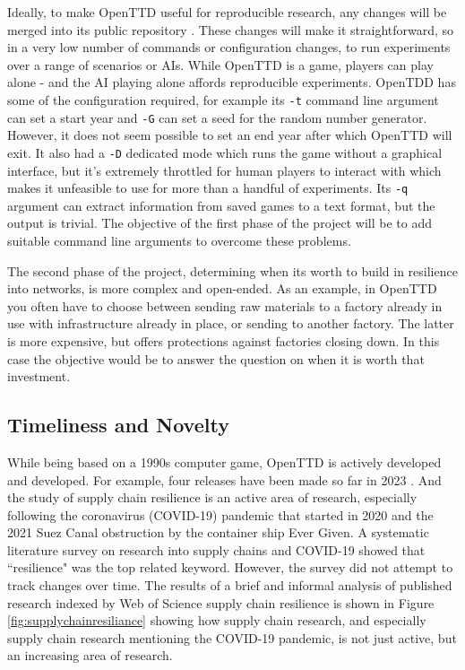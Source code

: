 \documentclass[a4paper,11pt]{article}
\begin{document}
Ideally, to make OpenTTD useful for reproducible research, any changes will be merged into its public repository \cite{openttdRepo}. These changes will make it straightforward, so in a very low number of commands or configuration changes, to run experiments over a range of scenarios or AIs. While OpenTTD is a game, players can play alone - and the AI playing alone affords reproducible experiments. OpenTDD has some of the configuration required, for example its \verb+-t+ command line argument can set a start year and \verb+-G+ can set a seed for the random number generator. However, it does not seem possible to set an end year after which OpenTTD will exit. It also had a  \verb+-D+ dedicated mode which runs the game without a graphical interface, but it's extremely throttled for human players to interact with which makes it unfeasible to use for more than a handful of experiments. Its \verb+-q+ argument can extract information from saved games to a text format, but the output is trivial. The objective of the first phase of the project will be to add suitable command line arguments to overcome these problems.

The second phase of the project, determining when its worth to build in resilience into networks, is more complex and open-ended. As an example, in OpenTTD you often have to choose between sending raw materials to a factory already in use with infrastructure already in place, or sending to another factory. The latter is more expensive, but offers protections against factories closing down. In this case the objective would be to answer the question on when it is worth that investment.

\subsection{Timeliness and Novelty}

While being based on a 1990s computer game, OpenTTD is actively developed and developed. For example, four releases have been made so far in 2023 \cite{openttdReleases}. And the study of supply chain resilience is an active area of research, especially following the coronavirus (COVID-19) pandemic that started in 2020 and the 2021 Suez Canal obstruction by the container ship Ever Given. A systematic literature survey on research into supply chains and COVID-19 \cite{moosavi_supply_2022} showed that ``resilience" was the top related keyword. However, the survey did not attempt to track changes over time. The results of a brief and informal analysis of published research indexed by Web of Science supply chain resilience is shown in Figure \ref{fig:supplychainresiliance} showing how supply chain research, and especially supply chain research mentioning the COVID-19 pandemic, is not just active, but an increasing area of research.
\end{document}
